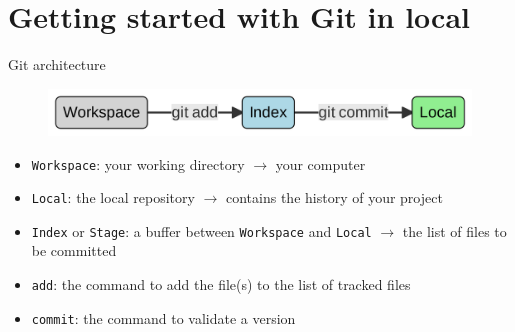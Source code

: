 \documentclass[10pt]{beamer}
\begin{document}
\section{Getting started with Git in local}







\begin{frame}[fragile]{Git architecture}
\protect\hypertarget{git-architecture}{}
\begin{figure}[H]

{\centering \includegraphics[width=\textwidth]{mermaid/mermaid-figure-1.png}

}

\end{figure}

\begin{itemize}
    \item
     \texttt{Workspace}: your working directory \(\rightarrow\) your
      computer
    \item
    \texttt{Local}: the local repository \(\rightarrow\) contains the
  history of your project
\item
  \texttt{Index} or \texttt{Stage}: a buffer between \texttt{Workspace} and \texttt{Local}
  \(\rightarrow\) the list of files to be committed
 \item
  \texttt{add}: the command to add the file(s) to the list of tracked files
  \item
  \texttt{commit}: the command to validate a version
\end{itemize}
\end{frame}
\end{document}
